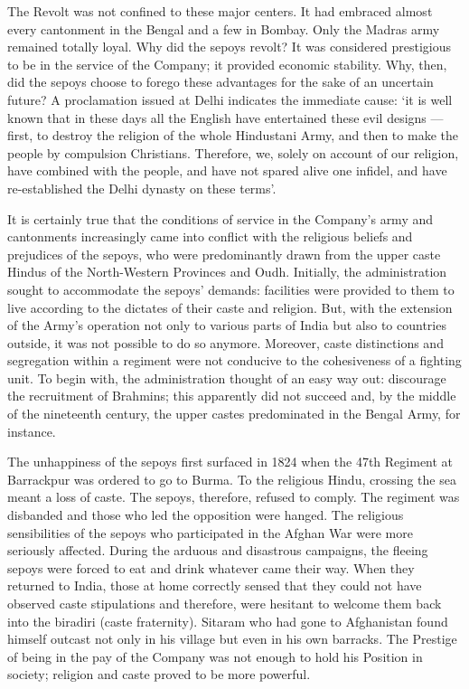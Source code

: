 \begin{multicols}{2}
The Revolt was not confined to these major centers. It had embraced almost every cantonment in the Bengal and a few in Bombay. Only the Madras army remained totally loyal. Why did the sepoys revolt? It was considered prestigious to be in the service of the Company; it provided economic stability. Why, then, did the sepoys choose to forego these advantages for the sake of an uncertain future? A proclamation issued at Delhi indicates the immediate cause: `it is well known that in these days all the English have entertained these evil designs --- first, to destroy the religion of the whole Hindustani Army, and then to make the people by compulsion Christians. Therefore, we, solely on account of our religion, have combined with the people, and have not spared alive one infidel, and have re-established the Delhi dynasty on these terms'.

It is certainly true that the conditions of service in the Company's army and cantonments increasingly came into conflict with the religious beliefs and prejudices of the sepoys, who were predominantly drawn from the upper caste Hindus of the North-Western Provinces and Oudh. Initially, the administration sought to accommodate the sepoys' demands: facilities were provided to them to live according to the dictates of their caste and religion. But, with the extension of the Army's operation not only to various parts of India but also to countries outside, it was not possible to do so anymore. Moreover, caste distinctions and segregation within a regiment were not conducive to the cohesiveness of a fighting unit. To begin with, the administration thought of an easy way out: discourage the recruitment of Brahmins; this apparently did not succeed and, by the middle of the nineteenth century, the upper castes predominated in the Bengal Army, for instance.

The unhappiness of the sepoys first surfaced in 1824 when the 47th Regiment at Barrackpur was ordered to go to Burma. To the religious Hindu, crossing the sea meant a loss of caste. The sepoys, therefore, refused to comply. The regiment was disbanded and those who led the opposition were hanged. The religious sensibilities of the sepoys who participated in the Afghan War were more seriously affected. During the arduous and disastrous campaigns, the fleeing sepoys were forced to eat and drink whatever came their way. When they returned to India, those at home correctly sensed that they could not have observed caste stipulations and therefore, were hesitant to welcome them back into the biradiri (caste fraternity). Sitaram who had gone to Afghanistan found himself outcast not only in his village but even in his own barracks. The Prestige of being in the pay of the Company was not enough to hold his Position in society; religion and caste proved to be more powerful.


\end{multicols}
